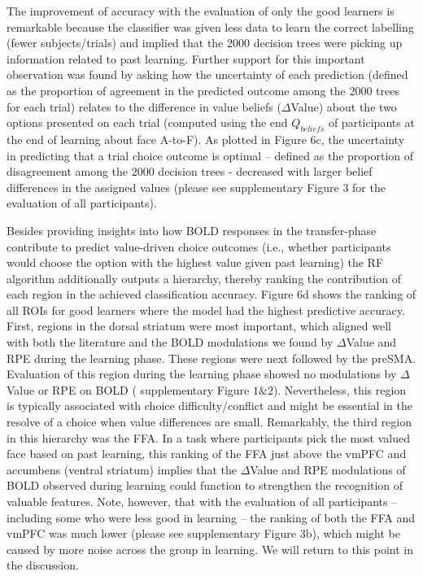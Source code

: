 \documentclass[]{article}
\begin{document}
The improvement of accuracy with the evaluation of only the good
learners is remarkable because the classifier was given less data to
learn the correct labelling (fewer subjects/trials) and implied that the
2000 decision trees were picking up information related to past
learning. Further support for this important observation was found by
asking how the uncertainty of each prediction (defined as the proportion
of agreement in the predicted outcome among the 2000 trees for each
trial) relates to the difference in value beliefs (\(\Delta\)Value)
about the two options presented on each trial (computed using the end
\(Q_{beliefs}\) of participants at the end of learning about face
A-to-F). As plotted in Figure 6c, the uncertainty in predicting that a
trial choice outcome is optimal -- defined as the proportion of
disagreement among the 2000 decision trees - decreased with larger
belief differences in the assigned values (please see supplementary
Figure 3 for the evaluation of all participants).

Besides providing insights into how BOLD responses in the transfer-phase
contribute to predict value-driven choice outcomes (i.e., whether
participants would choose the option with the highest value given past
learning) the RF algorithm additionally outputs a hierarchy, thereby
ranking the contribution of each region in the achieved classification
accuracy. Figure 6d shows the ranking of all ROIs for good learners
where the model had the highest predictive accuracy. First, regions in
the dorsal striatum were most important, which aligned well with both
the literature and the BOLD modulations we found by \(\Delta\)Value and
RPE during the learning phase. These regions were next followed by the
preSMA. Evaluation of this region during the learning phase showed no
modulations by \(\Delta\)Value or RPE on BOLD ( supplementary Figure
\(1\&2\)). Nevertheless, this region is typically associated with choice
difficulty/conflict and might be essential in the resolve of a choice
when value differences are small. Remarkably, the third region in this
hierarchy was the FFA. In a task where participants pick the most valued
face based on past learning, this ranking of the FFA just above the
vmPFC and accumbens (ventral striatum) implies that the \(\Delta\)Value
and RPE modulations of BOLD observed during learning could function to
strengthen the recognition of valuable features. Note, however, that
with the evaluation of all participants -- including some who were less
good in learning -- the ranking of both the FFA and vmPFC was much lower
(please see supplementary Figure 3b), which might be caused by more
noise across the group in learning. We will return to this point in the
discussion.
\end{document}
